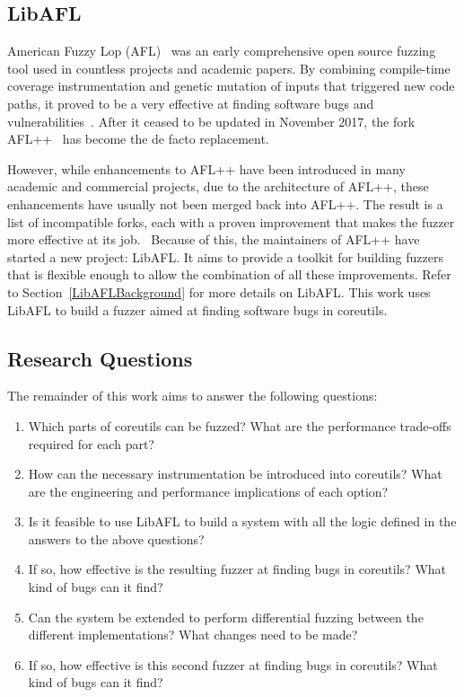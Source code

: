 \documentclass{article}
\let\savedCite=\cite
\renewcommand{\cite}{\unskip~\savedCite}
\begin{document}
\begin{multicols}{2}
    \subsection{LibAFL}
    \label{LibAFLHistory}

    American Fuzzy Lop (AFL)\cite{AFL} was an early comprehensive open source fuzzing tool used in countless projects and academic papers. By combining compile-time coverage instrumentation and genetic mutation of inputs that triggered new code paths, it proved to be a very effective at finding software bugs and vulnerabilities\cite{AFLBugs}. After it ceased to be updated in November 2017, the fork AFL++\cite{AFLPlusPlus} has become the de facto replacement.

    However, while enhancements to AFL++ have been introduced in many academic and commercial projects, due to the architecture of AFL++, these enhancements have usually not been merged back into AFL++. The result is a list of incompatible forks, each with a proven improvement that makes the fuzzer more effective at its job.\cite{LibAFL} Because of this, the maintainers of AFL++ have started a new project: LibAFL. It aims to provide a toolkit for building fuzzers that is flexible enough to allow the combination of all these improvements. Refer to Section~\ref{LibAFLBackground} for more details on LibAFL. This work uses LibAFL to build a fuzzer aimed at finding software bugs in coreutils.

    \subsection{Research Questions}
    \label{ResearchQuestions}

    The remainder of this work aims to answer the following questions:

    \begin{enumerate}
        \item Which parts of coreutils can be fuzzed? What are the performance trade-offs required for each part?
        \item How can the necessary instrumentation be introduced into coreutils? What are the engineering and performance implications of each option?
        \item Is it feasible to use LibAFL to build a system with all the logic defined in the answers to the above questions?
        \item If so, how effective is the resulting fuzzer at finding bugs in coreutils? What kind of bugs can it find?
        \item Can the system be extended to perform differential fuzzing between the different implementations? What changes need to be made?
        \item If so, how effective is this second fuzzer at finding bugs in coreutils? What kind of bugs can it find?
    \end{enumerate}


\end{multicols}
\end{document}
